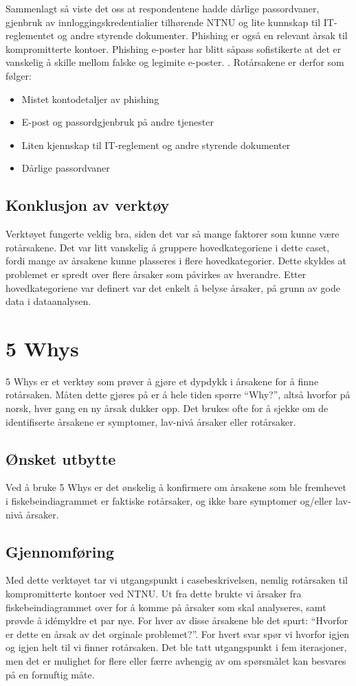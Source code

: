 Sammenlagt så viste det oss at respondentene hadde dårlige passordvaner, gjenbruk av innloggingskredentialier tilhørende NTNU og lite kunnskap til IT-reglementet og andre styrende dokumenter. Phishing er også en relevant årsak til kompromitterte kontoer. Phishing e-poster har blitt såpass sofistikerte at det er vanskelig å skille mellom falske og legimite e-poster. \cite{SophPhish}. Rotårsakene er derfor som følger: 

\begin{itemize}
    \item Mistet kontodetaljer av phishing
    \item E-post og passordgjenbruk på andre tjenester
    \item Liten kjennskap til IT-reglement og andre styrende dokumenter
    \item Dårlige passordvaner
\end{itemize}

\subsection{Konklusjon av verktøy}
Verktøyet fungerte veldig bra, siden det var så mange faktorer som kunne være rotårsakene. Det var litt vanskelig å gruppere hovedkategoriene i dette caset, fordi mange av årsakene kunne plasseres i flere hovedkategorier. Dette skyldes at problemet er spredt over flere årsaker som påvirkes av hverandre. Etter hovedkategoriene var definert var det enkelt å belyse årsaker, på grunn av gode data i dataanalysen. 

\section{5 Whys}
5 Whys er et verktøy som prøver å gjøre et dypdykk i årsakene for å finne rotårsaken. Måten dette gjøres på er å hele tiden spørre ``Why?'', altså hvorfor på norsk, hver gang en ny årsak dukker opp. Det brukes ofte for å sjekke om de identifiserte årsakene er symptomer, lav-nivå årsaker eller rotårsaker. 

\subsection{Ønsket utbytte}
Ved å bruke 5 Whys er det ønskelig å konfirmere om årsakene som ble fremhevet i fiskebeindiagrammet er faktiske rotårsaker, og ikke bare symptomer og/eller lav-nivå årsaker. 

\subsection{Gjennomføring}
Med dette verktøyet tar vi utgangspunkt i casebeskrivelsen, nemlig rotårsaken til kompromitterte kontoer ved NTNU. Ut fra dette brukte vi årsaker fra fiskebeindiagrammet over for å komme på årsaker som skal analyseres, samt prøvde å idémyldre et par nye. For hver av disse årsakene ble det spurt: ``Hvorfor er dette en årsak av det orginale problemet?''. For hvert svar spør vi hvorfor igjen og igjen helt til vi finner rotårsaken. Det ble tatt utgangspunkt i fem iterasjoner, men det er mulighet for flere eller færre avhengig av om spørsmålet kan besvares på en fornuftig måte. 

